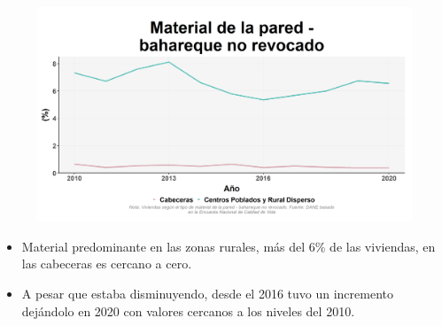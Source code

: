     \begin{figure}[H]
        \caption[Viviendas con pared de bahareque no revocado por zonas ]{\label{pared_bahareque_no_revo_zonas} }
        \begin{center}
        \includegraphics[width=\textwidth,keepaspectratio]{img/var_153_trend.png}
        \end{center}
    \end{figure}
            \begin{itemize}
                    \item Material predominante en las zonas rurales, más del 6\% de las viviendas, en las cabeceras es cercano a cero.
                    \item A pesar que estaba disminuyendo, desde el 2016 tuvo un incremento dejándolo en 2020 con valores cercanos a los niveles del 2010.
                    \end{itemize}

